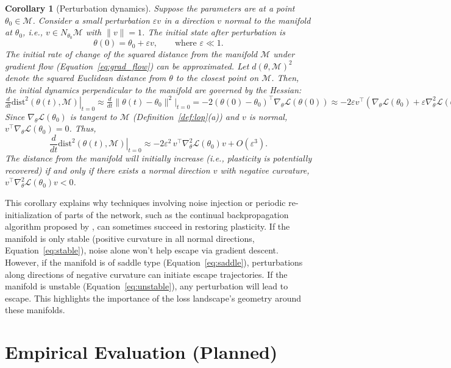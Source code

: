 \documentclass{article}
\newcommand{\Loss}{\mathcal{L}}
\newtheorem{corollary}{Corollary}[section]
\begin{document}
\begin{corollary}[Perturbation dynamics]
\label{cor:perturb}
Suppose the parameters are at a point $\theta_0 \in \mathcal{M}$. Consider a small perturbation $\varepsilon v$ in a direction $v$ normal to the manifold at $\theta_0$, i.e., $v \in N_{\theta_0}\mathcal{M}$ with $\|v\|=1$. The initial state after perturbation is
\[
\theta(0)=\theta_0+\varepsilon v,\qquad \text{where } \varepsilon \ll 1.
\]
The initial rate of change of the squared distance from the manifold $\mathcal{M}$ under gradient flow (Equation~\ref{eq:grad_flow}) can be approximated. Let $d(\theta, \mathcal{M})^2$ denote the squared Euclidean distance from $\theta$ to the closest point on $\mathcal{M}$. Then, the initial dynamics perpendicular to the manifold are governed by the Hessian:
\(
\frac{d}{dt}\left.\mathrm{dist}^2(\theta(t),\mathcal{M})\right|_{t=0} \approx \frac{d}{dt} \|\theta(t) - \theta_0\|^2 \Big|_{t=0} = -2 (\theta(0)-\theta_0)^\top \nabla_\theta \Loss(\theta(0)) \approx -2 \varepsilon v^\top (\nabla_\theta \Loss(\theta_0) + \varepsilon \nabla_\theta^2 \Loss(\theta_0) v)
\)
Since $\nabla_\theta \Loss(\theta_0)$ is tangent to $\mathcal{M}$ (Definition~\ref{def:lop}(a)) and $v$ is normal, $v^\top \nabla_\theta \Loss(\theta_0) = 0$. Thus,
\[
\frac{d}{dt}\left.\mathrm{dist}^2(\theta(t),\mathcal{M})\right|_{t=0} \approx -2\varepsilon^2\,v^\top\nabla_\theta^2\Loss(\theta_0)v + O(\varepsilon^3).
\]
The distance from the manifold will initially increase (i.e., plasticity is potentially recovered) if and only if there exists a normal direction $v$ with negative curvature, $v^\top\nabla_\theta^2\Loss(\theta_0)v < 0$.
\end{corollary}

This corollary explains why techniques involving noise injection or periodic re-initialization of parts of the network, such as the continual backpropagation algorithm proposed by \cite{dohare2024loss} , can sometimes succeed in restoring plasticity. If the manifold is only stable (positive curvature in all normal directions, Equation~\ref{eq:stable}), noise alone won't help escape via gradient descent. However, if the manifold is of saddle type (Equation~\ref{eq:saddle}), perturbations along directions of negative curvature can initiate escape trajectories. If the manifold is unstable (Equation~\ref{eq:unstable}), any perturbation will lead to escape. This highlights the importance of the loss landscape's geometry around these manifolds.

\section{Empirical Evaluation (Planned)}
\label{sec:experiments}
\end{document}
